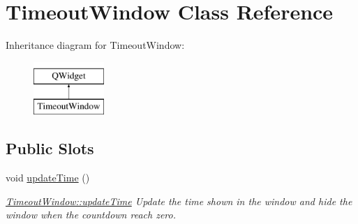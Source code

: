 \hypertarget{classTimeoutWindow}{}\section{Timeout\+Window Class Reference}
\label{classTimeoutWindow}
Inheritance diagram for Timeout\+Window\+:\begin{figure}[H]
\begin{center}
\leavevmode
\includegraphics[height=2.000000cm]{d3/d01/classTimeoutWindow}
\end{center}
\end{figure}
\subsection*{Public Slots}
\begin{DoxyCompactItemize}
\item 
\mbox{\label{classTimeoutWindow_ad9b2544b75e849b235aebd964c7ddff4}} 
void \mbox{\hyperlink{classTimeoutWindow_ad9b2544b75e849b235aebd964c7ddff4}{update\+Time}} ()
\begin{DoxyCompactList}\small\item\em \mbox{\hyperlink{classTimeoutWindow_ad9b2544b75e849b235aebd964c7ddff4}{Timeout\+Window\+::update\+Time}} Update the time shown in the window and hide the window when the countdown reach zero. \end{DoxyCompactList}\end{DoxyCompactItemize}
